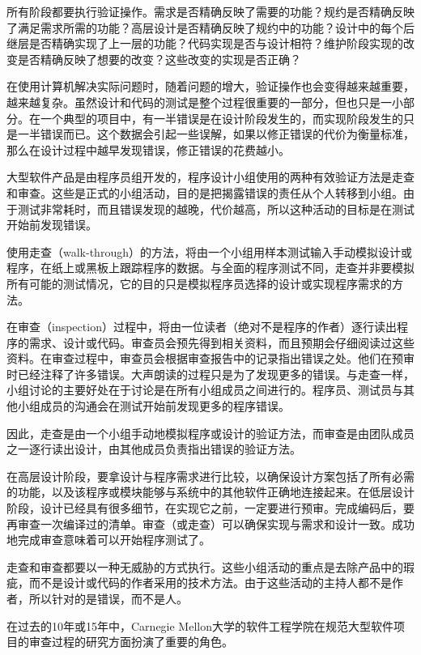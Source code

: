 所有阶段都要执行验证操作。需求是否精确反映了需要的功能？规约是否精确反映了满足需求所需的功能？高层设计是否精确反映了规约中的功能？设计中的每个后继层是否精确实现了上一层的功能？代码实现是否与设计相符？维护阶段实现的改变是否精确反映了想要的改变？这些改变的实现是否正确？

在使用计算机解决实际问题时，随着问题的增大，验证操作也会变得越来越重要，越来越复杂。虽然设计和代码的测试是整个过程很重要的一部分，但也只是一小部分。在一个典型的项目中，有一半错误是在设计阶段发生的，而实现阶段发生的只是一半错误而已。这个数据会引起一些误解，如果以修正错误的代价为衡量标准，那么在设计过程中越早发现错误，修正错误的花费越小。

大型软件产品是由程序员组开发的，程序设计小组使用的两种有效验证方法是走查和审查。这些是正式的小组活动，目的是把揭露错误的责任从个人转移到小组。由于测试非常耗时，而且错误发现的越晚，代价越高，所以这种活动的目标是在测试开始前发现错误。

使用{\heiti 走查（walk-through）}的方法，将由一个小组用样本测试输入手动模拟设计或程序，在纸上或黑板上跟踪程序的数据。与全面的程序测试不同，走查并非要模拟所有可能的测试情况，它的目的只是模拟程序员选择的设计或实现程序需求的方法。

在{\heiti 审查（inspection）}过程中，将由一位读者（绝对不是程序的作者）逐行读出程序的需求、设计或代码。审查员会预先得到相关资料，而且预期会仔细阅读过这些资料。在审查过程中，审查员会根据审查报告中的记录指出错误之处。他们在预审时已经注释了许多错误。大声朗读的过程只是为了发现更多的错误。与走查一样，小组讨论的主要好处在于讨论是在所有小组成员之间进行的。程序员、测试员与其他小组成员的沟通会在测试开始前发现更多的程序错误。

因此，走查是由一个小组手动地模拟程序或设计的验证方法，而审查是由团队成员之一逐行读出设计，由其他成员负责指出错误的验证方法。

在高层设计阶段，要拿设计与程序需求进行比较，以确保设计方案包括了所有必需的功能，以及该程序或模块能够与系统中的其他软件正确地连接起来。在低层设计阶段，设计已经具有很多细节，在实现它之前，一定要进行预审。完成编码后，要再审查一次编译过的清单。审查（或走查）可以确保实现与需求和设计一致。成功地完成审查意味着可以开始程序测试了。

走查和审查都要以一种无威胁的方式执行。这些小组活动的重点是去除产品中的瑕疵，而不是设计或代码的作者采用的技术方法。由于这些活动的主持人都不是作者，所以针对的是错误，而不是人。

在过去的10年或15年中，Carnegie Mellon大学的软件工程学院在规范大型软件项目的审查过程的研究方面扮演了重要的角色。


